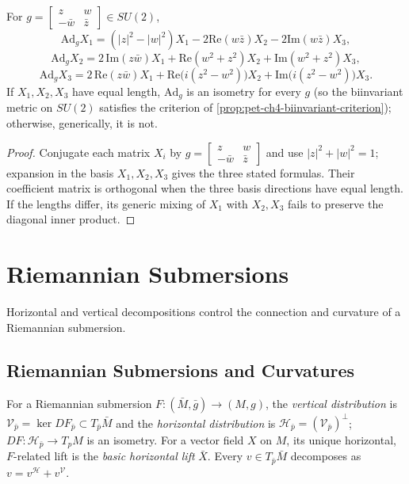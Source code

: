 \begin{proposition}
  \label{prop:pet-ch4-berger-adjoint-action}

  For $g=\left[\begin{smallmatrix}z&w\\-\bar w&\bar z\end{smallmatrix}\right]\in SU(2)$,
  \[
    \mathrm{Ad}_gX_1=(|z|^2-|w|^2)X_1-2\mathrm{Re}(w\bar z)X_2-2\mathrm{Im}(w\bar z)X_3,
  \]
  \[
    \mathrm{Ad}_gX_2=2\,\mathrm{Im}(z\bar w)X_1+\mathrm{Re}(w^2+z^2)X_2+\mathrm{Im}(w^2+z^2)X_3,
  \]
  \[
    \mathrm{Ad}_gX_3=2\,\mathrm{Re}(z\bar w)X_1+\mathrm{Re}\big(i(z^2-w^2)\big)X_2+\mathrm{Im}\big(i(z^2-w^2)\big)X_3.
  \]
  If $X_1,X_2,X_3$ have equal length, $\mathrm{Ad}_g$ is an isometry for every
  $g$ (so the biinvariant metric on $SU(2)$ satisfies the criterion of
  \cref{prop:pet-ch4-biinvariant-criterion}); otherwise, generically, it is
  not.
\end{proposition}
\begin{proof}
  \sketch
  Conjugate each matrix $X_i$ by
  $g=\left[\begin{smallmatrix}z&w\\-\bar w&\bar z\end{smallmatrix}\right]$ and use
  $|z|^2+|w|^2=1$; expansion in the basis $X_1,X_2,X_3$ gives the three stated
  formulas. Their coefficient matrix is orthogonal when the three basis
  directions have equal length. If the lengths differ, its generic mixing of
  $X_1$ with $X_2,X_3$ fails to preserve the diagonal inner product.
\end{proof}

\section{Riemannian Submersions}

Horizontal and vertical decompositions control the connection and curvature of a
Riemannian submersion.

\subsection{Riemannian Submersions and Curvatures}

\begin{definition}
  \label{def:pet-ch4-vertical-horizontal-distribution}

  For a Riemannian submersion $F:(\bar M,\bar g)\to(M,g)$, the \emph{vertical
  distribution} is $\mathcal V_{\bar p}=\ker DF_{\bar p}\subset T_{\bar p}\bar M$
  and the \emph{horizontal distribution} is $\mathcal H_{\bar p}=(\mathcal V_{\bar p})^\perp$;
  $DF:\mathcal H_{\bar p}\to T_pM$ is an isometry. For a vector field $X$ on
  $M$, its unique horizontal, $F$-related lift is the \emph{basic horizontal
  lift} $\bar X$. Every $v\in T_{\bar p}\bar M$ decomposes as $v=v^{\mathcal H}+v^{\mathcal V}$.
\end{definition}

